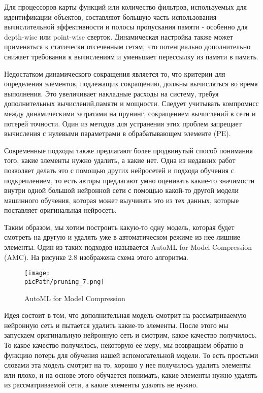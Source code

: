 \documentclass[oneside,final,12pt]{extreport}
\newcommand{\picPath}{images}
\begin{document}
Для процессоров карты функций или количество фильтров, используемых для идентификации объектов, составляют большую часть использования вычислительной эффективности и полосы пропускания памяти - особенно для  depth-wise или point-wise сверток. Динамическая настройка также может применяться к статически отсеченным сетям, что потенциально дополнительно снижает требования к вычислениям и уменьшает перессылку из памяти в память.

Недостатком динамического сокращения является то, что критерии для определения элементов, подлежащих сокращению, должны вычисляться во время выполнения. Это увеличивает накладные расходы на систему, требуя дополнительных вычислений,памяти и мощности. Следует учитывать компромисс между динамическими затратами на прунинг, сокращением вычислений в сети и потерей точности. Один из методов для устранения этих проблем запрещает вычисления с нулевыми параметрами в обрабатывающем элементе (PE).

Современные подходы также предлагают более продвинутый способ понимания того, какие элементы нужно удалить, а какие нет. Одна из недавних работ позволяет делать это с помощью других нейросетей и подхода обучения с подкреплением, то есть авторы предлагают умно оценивать какие-то значимости внутри одной большой нейронной сети с помощью какой-то другой модели машинного обучения, которая может выучивать это из тех данных, которые поставляет оригинальная нейросеть. 

Таким образом, мы хотим построить какую-то одну модель, которая будет смотреть на другую и удалять уже в автоматическом режиме из нее лишние элементы. Один из таких подходов называется AutoML for Model Compression (AMC). На рисунке 2.8 изображена схема этого алгоритма.
\begin{figure}[H]
\begin{center}
  \texttt{[image: \\picPath/pruning\_7.png]}
  \caption{AutoML for Model Compression}
  \label{fig:pruning_7}
  \end{center}
\end{figure}
Идея состоит в том, что дополнительная модель смотрит на рассматриваемую нейронную сеть и пытается удалить какие-то элементы. После этого мы запускаем оригинальную нейронную сеть и смотрим, какое качество получилось. То какое качество получилось, некоторую ее меру, мы возвращаем обратно в функцию потерь для обучения нашей вспомогательной модели. То есть простыми словами эта модель смотрит на то, хорошо у нее получилось удалить элементы или плохо, и на основе этого обучается понимать, какие элементы нужно удалять из рассматриваемой сети, а какие элементы удалять не нужно.
\end{document}
